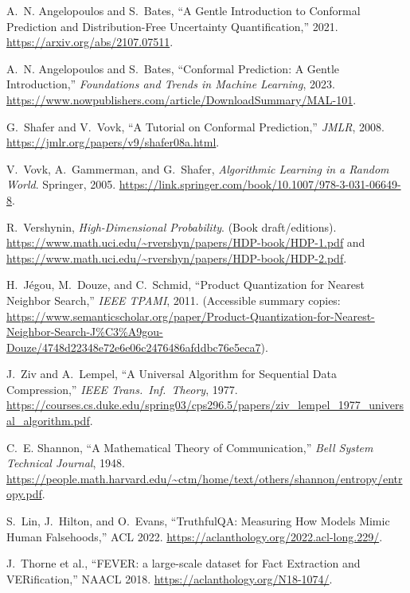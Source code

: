 \documentclass[11pt]{article}
\begin{document}
\begin{thebibliography}{99}\setlength{\itemsep}{0pt}
A.~N. Angelopoulos and S.~Bates, ``A Gentle Introduction to Conformal Prediction and Distribution-Free Uncertainty Quantification,'' 2021. \url{https://arxiv.org/abs/2107.07511}.

A.~N. Angelopoulos and S.~Bates, ``Conformal Prediction: A Gentle Introduction,'' \emph{Foundations and Trends in Machine Learning}, 2023. \url{https://www.nowpublishers.com/article/DownloadSummary/MAL-101}.

G.~Shafer and V.~Vovk, ``A Tutorial on Conformal Prediction,'' \emph{JMLR}, 2008. \url{https://jmlr.org/papers/v9/shafer08a.html}.

V.~Vovk, A.~Gammerman, and G.~Shafer, \emph{Algorithmic Learning in a Random World}. Springer, 2005. \url{https://link.springer.com/book/10.1007/978-3-031-06649-8}.

R.~Vershynin, \emph{High-Dimensional Probability}. (Book draft/editions). \url{https://www.math.uci.edu/~rvershyn/papers/HDP-book/HDP-1.pdf} and \url{https://www.math.uci.edu/~rvershyn/papers/HDP-book/HDP-2.pdf}.

H.~J{\'e}gou, M.~Douze, and C.~Schmid, ``Product Quantization for Nearest Neighbor Search,'' \emph{IEEE TPAMI}, 2011. (Accessible summary copies: \url{https://www.semanticscholar.org/paper/Product-Quantization-for-Nearest-Neighbor-Search-J%C3%A9gou-Douze/4748d22348e72e6e06c2476486afddbc76e5eca7}).

J.~Ziv and A.~Lempel, ``A Universal Algorithm for Sequential Data Compression,'' \emph{IEEE Trans.\ Inf.\ Theory}, 1977. \url{https://courses.cs.duke.edu/spring03/cps296.5/papers/ziv_lempel_1977_universal_algorithm.pdf}.

C.~E. Shannon, ``A Mathematical Theory of Communication,'' \emph{Bell System Technical Journal}, 1948. \url{https://people.math.harvard.edu/~ctm/home/text/others/shannon/entropy/entropy.pdf}.

S.~Lin, J.~Hilton, and O.~Evans, ``TruthfulQA: Measuring How Models Mimic Human Falsehoods,'' ACL 2022. \url{https://aclanthology.org/2022.acl-long.229/}.

J.~Thorne et al., ``FEVER: a large-scale dataset for Fact Extraction and VERification,'' NAACL 2018. \url{https://aclanthology.org/N18-1074/}.


\end{thebibliography}
\end{document}
